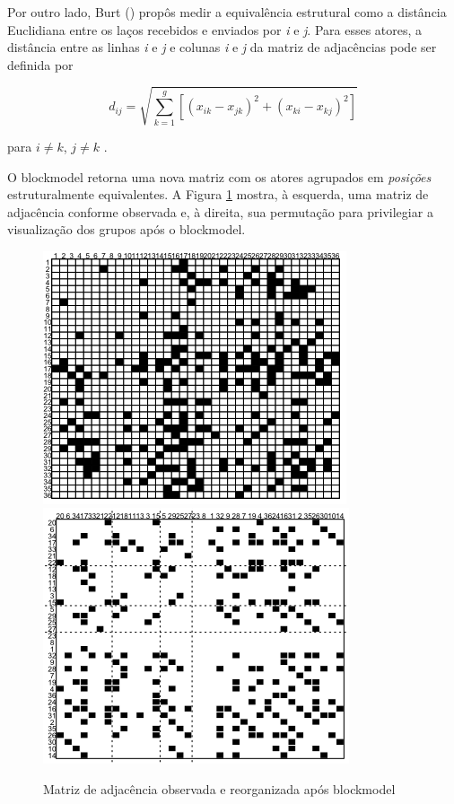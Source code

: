 \documentclass[a4paper, 12pt, openright, oneside, german, french, english, brazil]{abntex2}
\begin{document}
	Por outro lado, Burt (\citeyear{burt1976positions,burt1982toward}) propôs medir a equivalência estrutural como a distância Euclidiana entre os laços recebidos e enviados por \textit{i} e \textit{j}. Para esses atores, a distância entre as linhas \textit{i} e \textit{j} e colunas \textit{i} e \textit{j} da matriz de adjacências pode ser definida por
	
	\begin{equation}
	d_{ij} = \sqrt{\sum_{k=1}^{g} [(x_{ik} - x_{jk})^2 + (x_{ki} - x_{kj})^2 ] }
	\end{equation}
	
	para $i \neq k$, $j \neq k$ \cite{wasserman1994social}. 
	
	
	O blockmodel retorna uma nova matriz com os atores agrupados em \textit{posições} estruturalmente equivalentes. A Figura \ref{example-socio-blocked-matrix} mostra, à esquerda, uma matriz de adjacência conforme observada e, à direita, sua permutação para privilegiar a visualização dos grupos após o blockmodel.
	
	
	\begin{figure}[!ht]
		\centering
		\caption{Matriz de adjacência observada e reorganizada após blockmodel}
		\label{example-socio-blocked-matrix}
		\includegraphics[scale=.6]{example_sociomatrix.png}
		\includegraphics[scale=.6]{example_blockedmatrix.png}
	\end{figure}
	
\end{document}
